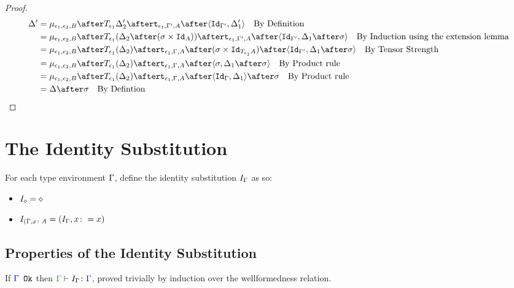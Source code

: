 \documentclass{report}
\begin{document}
\begin{framed}
\begin{proof}
        \begin{align*}
            \D' & = \bind{\e_1}{\e_2}{B}\after\T{\e_1}{\D_2'}\after\tstrength{\e_1}{\G'}{A}\after\pr{\Id{\G'}}{\D_1'}\qt{By Definition}\\
            & = \bind{\e_1}{\e_2}{B}\after\T{\e_1}{(\D_2\after(\si\times\Id{A}))}\after\tstrength{\e_1}{\G'}{A}\after\pr{\Id{\G'}}{\D_1\after\si}\qt{By Induction using the extension lemma}\\
            & = \bind{\e_1}{\e_2}{B}\after\T{\e_1}{(\D_2)}\after\tstrength{\e_1}{\G}{A}\after(\si\times\Id{\T{\e_1}{A}})\after\pr{\Id{\G'}}{\D_1\after\si}\qt{By Tensor Strength}\\
            & = \bind{\e_1}{\e_2}{B}\after\T{\e_1}{(\D_2)}\after\tstrength{\e_1}{\G}{A}\after\pr{\si}{\D_1\after\si}\qt{By Product rule}\\
            & = \bind{\e_1}{\e_2}{B}\after\T{\e_1}{(\D_2)}\after\tstrength{\e_1}{\G}{A}\after\pr{\idg}{\D_1}\after\si\qt{By Product rule}\\
            &= \D\after\si\qt{By Defintion}\\
        \end{align*}
        
        
    \end{proof}
\end{framed}


\section{The Identity Substitution}
For each type environment $\Gamma$, define the identity substitution $I_{\Gamma}$ as so:

\begin{itemize}
    \item $I_{\diamond} = \diamond$
    \item $I_{(\Gamma, x\colon A} = (I_{\Gamma}, x\colon= x)$
\end{itemize}

\subsection{Properties of the Identity Substitution}


\begin{property}[Wellformedness]\label{IdPropOne}
    If ${\color{blue} \Gamma} \texttt{ Ok}$ then $\typerelation{\G}{I_{\G}}{\G}$, proved trivially by induction over the wellformedness relation.
\end{property}
\end{document}
